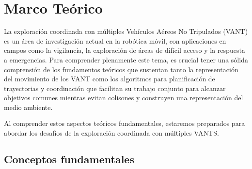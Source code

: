 \chapter{Marco Teórico}

La exploración coordinada con múltiples Vehículos Aéreos No Tripulados (VANT) es un área de investigación actual en la robótica móvil, con aplicaciones en campos como la vigilancia, la exploración de áreas de difícil acceso y la respuesta a emergencias. Para comprender plenamente este tema, es crucial tener una sólida comprensión de los fundamentos teóricos que sustentan tanto la representación del movimiento de los VANT como los algoritmos para planificación de trayectorias y coordinación que facilitan su trabajo conjunto para alcanzar objetivos comunes mientras evitan colisones y construyen una representación del medio ambiente.




Al comprender estos aspectos teóricos fundamentales, estaremos preparados para abordar los desafíos de la exploración coordinada con múltiples VANTS.


\section{Conceptos fundamentales} \label{}

